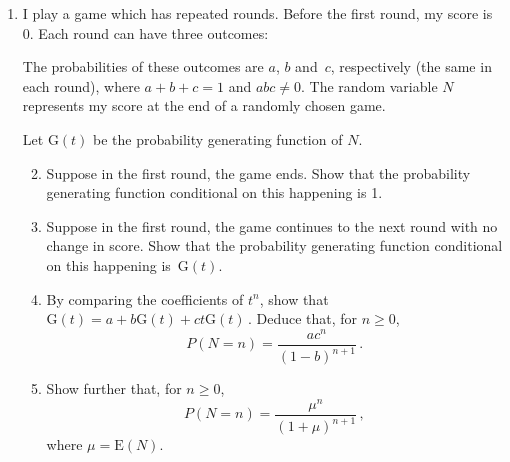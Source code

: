 \documentclass[a4, 11pt]{report}
\newlength{\qspace}
\newcounter{qnumber}
\newenvironment{question}%
 {\vspace{\qspace}
  \begin{enumerate}[\bfseries 1\quad][10]%
    \setcounter{enumi}{\value{qnumber}}%
    \item%
 }
{
  \end{enumerate}
  \filbreak
  \stepcounter{qnumber}
 }
\newenvironment{questionparts}[1][1]%
 {
  \begin{enumerate}[\bfseries (i)]%
    \setcounter{enumii}{#1}
    \addtocounter{enumii}{-1}
    \setlength{\itemsep}{5mm}
    \setlength{\parskip}{8pt}
 }
 {
  \end{enumerate}
 }
\def\ge{\geqslant}
\renewcommand{\.}[1]{\ensuremath{\mathrm{#1}}}
\newcommand{\+}[1]{\ensuremath{\mathbf{#1}}}
\begin{document}
\begin{question}
  I play a game which has repeated rounds. Before the
  first round, my score is $0$. Each round can have three outcomes:
   The probabilities of these outcomes  are $a$, $b$
  and~$c$, respectively (the same in each round), 
where $a+b+c=1$ and $abc\ne0$.  The random
  variable $N$ represents my score at the end of a randomly chosen
game.  

  Let $\.G(t)$ be the probability generating function of
    $N$. 
  \begin{questionparts}
  \item 
Suppose in the first round, the game ends. 
Show that the probability generating
function conditional on this happening is 1.

\item
Suppose in the first round, 
the game continues to the next round with no change in
score. 
Show that the probability generating function conditional on this happening
is~$\.G(t)$.

\item By comparing the coefficients of $t^n$, show that 
$   
    \.G(t) = a + b\.G(t) + ct\.G(t)\,.
 $  
      Deduce that,
for $n\ge0$,
    \[
P(N=n)  = \frac{ac^n}{(1-b)^{n+1}}\,.
    \]
  \item Show further that, for $n\ge0$,
    \[
 P(N=n)  = \frac{\mu^n}{(1+\mu)^{n+1}}\,,
    \]
where  $\mu=\.E(N)$.
  \end{questionparts}
\end{question}
\end{document}
